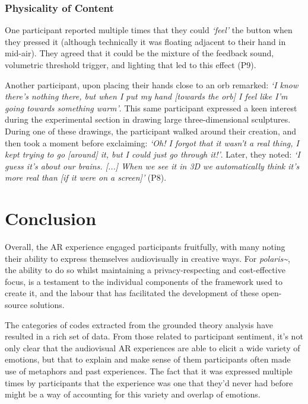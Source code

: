 \subsubsection{Physicality of Content}\label{sec: polaris-feedback-immersion-physicality}
One participant reported multiple times that they could \textit{`feel'} the button when they pressed it (although technically it was floating adjacent to their hand in mid-air). They agreed that it could be the mixture of the feedback sound, volumetric threshold trigger, and lighting that led to this effect (P9).

Another participant, upon placing their hands close to an orb remarked: \textit{`I know there's nothing there, but when I put my hand [towards the orb] I feel like I'm going towards something warm'}. This same participant expressed a keen interest during the experimental section in drawing large three-dimensional sculptures. During one of these drawings, the participant walked around their creation, and then took a moment before exclaiming: \textit{`Oh! I forgot that it wasn't a real thing, I kept trying to go [around] it, but I could just go through it!'}. Later, they noted: \textit{`I guess it's about our brains. [...] When we see it in 3D we automatically think it's more real than [if it were on a screen]'} (P8).

\section{Conclusion}\label{sec: polaris-conclusion}
Overall, the AR experience engaged participants fruitfully, with many noting their ability to express themselves audiovisually in creative ways. For \textit{polaris\textasciitilde{}}, the ability to do so whilst maintaining a privacy-respecting and cost-effective focus, is a testament to the individual components of the framework used to create it, and the labour that has facilitated the development of these open-source solutions.

The categories of codes extracted from the grounded theory analysis have resulted in a rich set of data. From those related to participant sentiment, it's not only clear that the audiovisual AR experiences are able to elicit a wide variety of emotions, but that to explain and make sense of them participants often made use of metaphors and past experiences. The fact that it was expressed multiple times by participants that the experience was one that they'd never had before might be a way of accounting for this variety and overlap of emotions.

